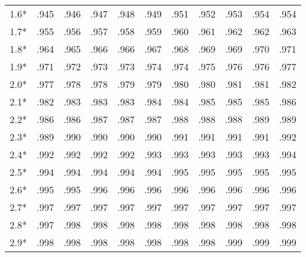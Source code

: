 \begin{tabular} {r|rrrrrrrrrr}
1.6* & .945 & .946 & .947 & .948 & .949 & .951 & .952 & .953 & .954 & .954 \\
1.7* & .955 & .956 & .957 & .958 & .959 & .960 & .961 & .962 & .962 & .963 \\
1.8* & .964 & .965 & .966 & .966 & .967 & .968 & .969 & .969 & .970 & .971 \\
1.9* & .971 & .972 & .973 & .973 & .974 & .974 & .975 & .976 & .976 & .977 \\
\hline
2.0* & .977 & .978 & .978 & .979 & .979 & .980 & .980 & .981 & .981 & .982 \\
2.1* & .982 & .983 & .983 & .983 & .984 & .984 & .985 & .985 & .985 & .986 \\
2.2* & .986 & .986 & .987 & .987 & .987 & .988 & .988 & .988 & .989 & .989 \\
2.3* & .989 & .990 & .990 & .990 & .990 & .991 & .991 & .991 & .991 & .992 \\
2.4* & .992 & .992 & .992 & .992 & .993 & .993 & .993 & .993 & .993 & .994 \\
\hline
2.5* & .994 & .994 & .994 & .994 & .994 & .995 & .995 & .995 & .995 & .995 \\
2.6* & .995 & .995 & .996 & .996 & .996 & .996 & .996 & .996 & .996 & .996 \\
2.7* & .997 & .997 & .997 & .997 & .997 & .997 & .997 & .997 & .997 & .997 \\
2.8* & .997 & .998 & .998 & .998 & .998 & .998 & .998 & .998 & .998 & .998 \\
2.9* & .998 & .998 & .998 & .998 & .998 & .998 & .998 & .999 & .999 & .999 \\
\end{tabular}
\newpage
